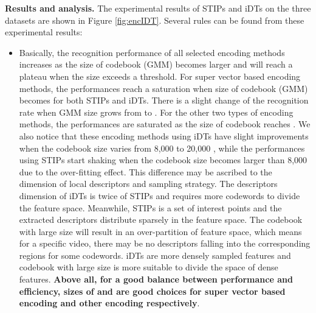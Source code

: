 \documentclass[twocolumn]{svjour3}          \smartqed  \usepackage{slashbox}
\begin{document}
\textbf{Results and analysis.} The experimental results of STIPs and iDTs on the three datasets are shown in Figure \ref{fig:encIDT}. Several rules can be found from these experimental results:
\begin{itemize}
  \item Basically, the recognition performance of all selected encoding methods increases as the size of codebook (GMM) becomes larger and will reach a plateau when the size exceeds a threshold. For super vector based encoding methods, the performances reach a saturation when size of codebook (GMM) becomes  for both STIPs and iDTs. There is a slight change of the recognition rate when GMM size grows from  to . For the other two types of encoding methods, the performances are saturated as the size of codebook reaches . We also notice that these encoding methods using iDTs have slight improvements when the codebook size varies from 8,000 to 20,000 , while the performances using STIPs start shaking when the codebook size becomes larger than 8,000 due to the over-fitting effect. This difference may be ascribed to the dimension of local descriptors and sampling strategy. The descriptors dimension of iDTs is twice of STIPs and requires more codewords to divide the feature space. Meanwhile, STIPs is a set of interest points and the extracted descriptors distribute sparsely in the feature space. The codebook with large size will result in an over-partition of feature space, which means for a specific video, there may be no descriptors falling into the corresponding regions for some codewords. iDTs are more densely sampled features and codebook with large size is more suitable to divide the space of dense features. \textbf{Above all, for a good balance between performance and efficiency, sizes of  and  are good choices for super vector based encoding and other encoding respectively}.

\end{itemize}
\end{document}
